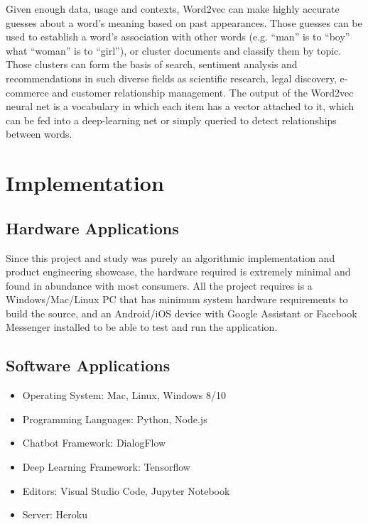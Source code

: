 \documentclass[conference,compsoc]{IEEEtran}
\begin{document}
Given enough data, usage and contexts, Word2vec can make highly accurate guesses about a word’s meaning based on past appearances. Those guesses can be used to establish a word’s association with other words (e.g. “man” is to “boy” what “woman” is to “girl”), or cluster documents and classify them by topic. Those clusters can form the basis of search, sentiment analysis and recommendations in such diverse fields as scientific research, legal discovery, e-commerce and customer relationship management. The output of the Word2vec neural net is a vocabulary in which each item has a vector attached to it, which can be fed into a deep-learning net or simply queried to detect relationships between words.


\section{Implementation}

\subsection{Hardware Applications}

Since this project and study was purely an algorithmic implementation and product engineering showcase, the hardware required is extremely minimal and found in abundance with most consumers. All the project requires is a Windows/Mac/Linux PC that has minimum system hardware requirements to build the source, and an Android/iOS device with Google Assistant or Facebook Messenger installed to be able to test and run the application.

\subsection{Software Applications}

\begin{itemize}
    \item Operating System: Mac, Linux, Windows 8/10
    \item Programming Languages: Python, Node.js
    \item Chatbot Framework: DialogFlow
    \item Deep Learning Framework: Tensorflow
    \item Editors: Visual Studio Code, Jupyter Notebook
    \item Server: Heroku
\end{itemize}
\end{document}

